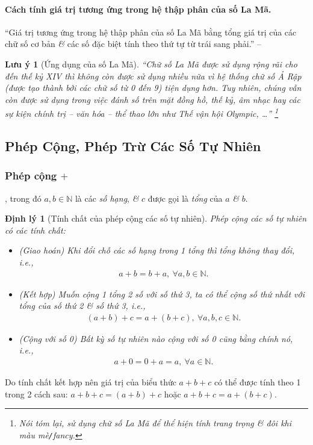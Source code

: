 \documentclass{article}
\numberwithin{equation}{section}
\newtheorem{luuy}{Lưu ý}[section]
\newtheorem{dinhly}{Định lý}[section]
\begin{document}
\paragraph{Cách tính giá trị tương ứng trong hệ thập phân của số La Mã.} ``Giá trị tương ứng trong hệ thập phân của số La Mã bằng tổng giá trị của các chữ số cơ bản \textit{\&} các số đặc biệt tính theo thứ tự từ trái sang phải.'' -- \cite[p. 14]{SGK_Toan_6_Canh_Dieu_tap_1}

\begin{luuy}[Ứng dụng của số La Mã]
	``Chữ số La Mã được sử dụng rộng rãi cho đến thế kỷ XIV thì không còn được sử dụng nhiều nữa vì hệ thống chữ số Ả Rập (được tạo thành bởi các chữ số từ 0 đến 9) tiện dụng hơn. Tuy nhiên, chúng vẫn còn được sử dụng trong việc đánh số trên mặt đồng hồ, thế kỷ, âm nhạc hay các sự kiện chính trị -- văn hóa -- thể thao lớn như Thế vận hội Olympic, \ldots'' \footnote{Nói tóm lại, sử dụng chữ số La Mã để thể hiện tính trang trọng \textit{\&} đôi khi màu mè\texttt{/}fancy.}
\end{luuy}


\subsection{Phép Cộng, Phép Trừ Các Số Tự Nhiên}

\subsubsection{Phép cộng $+$}
, trong đó $a,b\in\mathbb{N}$ là các \textit{số hạng}, \textit{\&} $c$ được gọi là \textit{tổng} của $a$ \textit{\&} $b$.

\begin{dinhly}[Tính chất của phép cộng các số tự nhiên]
	Phép cộng các số tự nhiên có các tính chất:
	\begin{itemize}
		\item (Giao hoán) Khi đổi chỗ các số hạng trong 1 tổng thì tổng không thay đổi, i.e.,
		\begin{align*}
			a + b = b + a,\ \forall a,b\in\mathbb{N}.
		\end{align*}
		\item (Kết hợp) Muốn cộng 1 tổng 2 số với số thứ 3, ta có thể cộng số thứ nhất với tổng của số thứ 2 \textit{\&} số thứ 3, i.e.,
		\begin{align*}
			(a + b) + c = a +(b + c),\ \forall a,b,c\in\mathbb{N}.
		\end{align*}
		\item (Cộng với số 0) Bất kỳ số tự nhiên nào cộng với số 0 cũng bằng chính nó, i.e.,
		\begin{align*}
			a + 0 = 0 + a = a,\ \forall a\in\mathbb{N}.
		\end{align*}
	\end{itemize}
\end{dinhly}
Do tính chất kết hợp nên giá trị của biểu thức $a + b + c$ có thể được tính theo 1 trong 2 cách sau: $a + b + c = (a + b) + c$ hoặc $a + b + c = a + (b + c)$.
\end{document}
